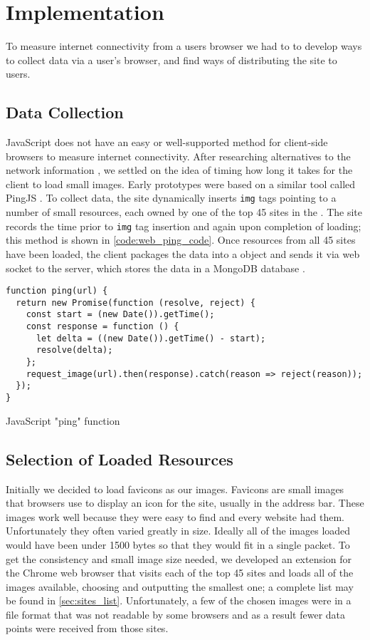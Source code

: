 \section{Implementation}\label{sec:web_ping_impl}

To measure internet connectivity from a users browser we had to to develop ways to collect data via a user's browser, and find ways of distributing the site to users.

\subsection{Data Collection}
JavaScript does not have an easy or well-supported method for client-side browsers to measure internet connectivity. After researching alternatives to the network information \api, we settled on the idea of timing how long it takes for the client to load small images. Early prototypes were based on a similar tool called PingJS \cite{Frederic2016a}. To collect data, the site dynamically inserts \html \texttt{img} tags pointing to a number of small resources, each owned by one of the top 45 sites in the \us. The site records the time prior to \texttt{img} tag insertion and again upon completion of loading; this method is shown in \cref{code:web_ping_code}. Once resources from all 45 sites have been loaded, the client packages the data into a \json object and sends it via web socket to the server, which stores the data in a MongoDB database \cite{MongoDB2019a}. 

\begin{code}[htb]
    \centering
    \small
    \begin{verbatim}
function ping(url) {
  return new Promise(function (resolve, reject) {
    const start = (new Date()).getTime();
    const response = function () {
      let delta = ((new Date()).getTime() - start);
      resolve(delta);
    };
    request_image(url).then(response).catch(reason => reject(reason));
  });
}
    \end{verbatim}
    \caption{JavaScript "ping" function}
    \label{code:web_ping_code}
\end{code}


\subsection{Selection of Loaded Resources}
Initially we decided to load favicons as our images. Favicons are small images that browsers use to display an icon for the site, usually in the address bar. These images work well because they were easy to find and every website had them. Unfortunately they often varied greatly in size. Ideally all of the images loaded would have been under 1500 bytes so that they would fit in a single \tcp packet. To get the consistency and small image size needed, we developed an extension for the Chrome web browser that visits each of the top 45 sites and loads all of the images available, choosing and outputting the smallest one; a complete list may be found in \cref{sec:sites_list}. Unfortunately, a few of the chosen images were in a file format that was not readable by some browsers and as a result fewer data points were received from those sites.

